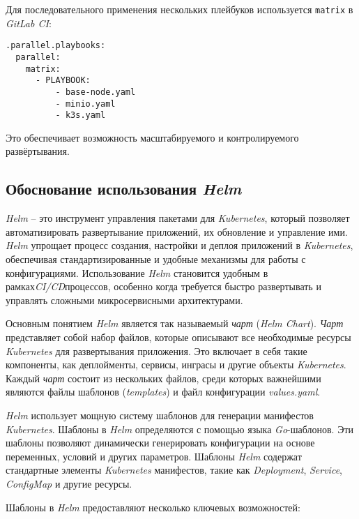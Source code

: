 Для последовательного применения нескольких плейбуков используется \lstinline{matrix} в \textit{GitLab CI}:

\begin{lstlisting}
.parallel.playbooks:
  parallel:
    matrix:
      - PLAYBOOK:
          - base-node.yaml
          - minio.yaml
          - k3s.yaml
\end{lstlisting}

Это обеспечивает возможность масштабируемого и контролируемого развёртывания.


\subsection{Обоснование использования \textit{Helm}}

\textit{Helm} -- это инструмент управления пакетами для \textit{Kubernetes}, который позволяет автоматизировать развертывание приложений, их обновление и управление ими. \textit{Helm} упрощает процесс создания, настройки и деплоя приложений в \textit{Kubernetes}, обеспечивая стандартизированные и удобные механизмы для работы с конфигурациями. Использование \textit{Helm} становится удобным в рамках\textit{CI/CD}процессов, особенно когда требуется быстро развертывать и управлять сложными микросервисными архитектурами.

Основным понятием \textit{Helm} является так называемый \textit{чарт} (\textit{Helm Chart}). \textit{Чарт} представляет собой набор файлов, которые описывают все необходимые ресурсы \textit{Kubernetes} для развертывания приложения. Это включает в себя такие компоненты, как деплойменты, сервисы, инграсы и другие объекты \textit{Kubernetes}. Каждый \textit{чарт} состоит из нескольких файлов, среди которых важнейшими являются файлы шаблонов (\textit{templates}) и файл конфигурации \textit{values.yaml}.

\textit{Helm} использует мощную систему шаблонов для генерации манифестов \textit{Kubernetes}. Шаблоны в \textit{Helm} определяются с помощью языка \textit{Go}-шаблонов. Эти шаблоны позволяют динамически генерировать конфигурации на основе переменных, условий и других параметров. Шаблоны \textit{Helm} содержат стандартные элементы \textit{Kubernetes} манифестов, такие как \textit{Deployment}, \textit{Service}, \textit{ConfigMap} и другие ресурсы. 

Шаблоны в \textit{Helm} предоставляют несколько ключевых возможностей:

